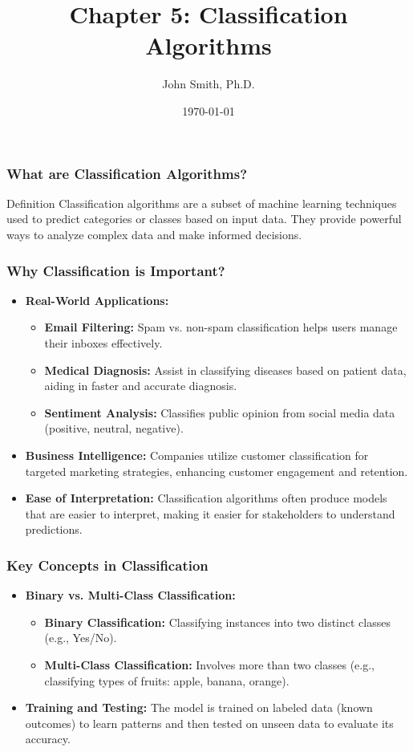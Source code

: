 \documentclass[aspectratio=169]{beamer}
\title[Chapter 5: Classification Algorithms]{Chapter 5: Classification Algorithms}
\author[J. Smith]{John Smith, Ph.D.}
\institute[University Name]{
  Department of Computer Science\\
  University Name\\
  \vspace{0.3cm}
  Email: email@university.edu\\
  Website: www.university.edu
}
\date{\today}
\begin{document}
\frame{\titlepage}

\begin{frame}[fragile]
    \titlepage
\end{frame}

\begin{frame}[fragile]
    \frametitle{What are Classification Algorithms?}
    \begin{block}{Definition}
        Classification algorithms are a subset of machine learning techniques used to predict categories or classes based on input data. They provide powerful ways to analyze complex data and make informed decisions.
    \end{block}
\end{frame}

\begin{frame}[fragile]
    \frametitle{Why Classification is Important?}
    \begin{itemize}
        \item \textbf{Real-World Applications:}
        \begin{itemize}
            \item \textbf{Email Filtering:} Spam vs. non-spam classification helps users manage their inboxes effectively.
            \item \textbf{Medical Diagnosis:} Assist in classifying diseases based on patient data, aiding in faster and accurate diagnosis.
            \item \textbf{Sentiment Analysis:} Classifies public opinion from social media data (positive, neutral, negative).
        \end{itemize}
        \item \textbf{Business Intelligence:} 
        Companies utilize customer classification for targeted marketing strategies, enhancing customer engagement and retention.
        \item \textbf{Ease of Interpretation:} 
        Classification algorithms often produce models that are easier to interpret, making it easier for stakeholders to understand predictions.
    \end{itemize}
\end{frame}

\begin{frame}[fragile]
    \frametitle{Key Concepts in Classification}
    \begin{itemize}
        \item \textbf{Binary vs. Multi-Class Classification:}
        \begin{itemize}
            \item \textbf{Binary Classification:} Classifying instances into two distinct classes (e.g., Yes/No).
            \item \textbf{Multi-Class Classification:} Involves more than two classes (e.g., classifying types of fruits: apple, banana, orange).
        \end{itemize}
        \item \textbf{Training and Testing:} 
        The model is trained on labeled data (known outcomes) to learn patterns and then tested on unseen data to evaluate its accuracy.
    \end{itemize}
\end{frame}
\end{document}

